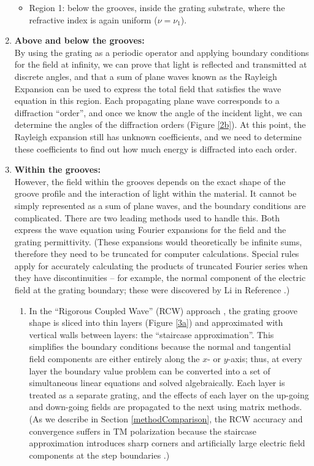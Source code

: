 \begin{enumerate}
\begin{itemize}
	\item Region 1: below the grooves, inside the grating substrate, where the refractive index is again uniform ($\nu=\nu_1$).
	\end{itemize}
\item \textbf{Above and below the grooves:}\\
By using the grating as a periodic operator and applying boundary conditions for the field at infinity, we can prove that light is reflected and transmitted at discrete angles, and that a sum of plane waves known as the Rayleigh Expansion can be used to express the total field that satisfies the wave equation in this region.  Each propagating plane wave corresponds to a diffraction ``order'', and once we know the angle of the incident light, we can determine the angles of the diffraction orders (Figure \ref{2b}).  At this point, the Rayleigh expansion still has unknown coefficients, and we need to determine these coefficients to find out how much energy is diffracted into each order.
\item \textbf{Within the grooves:}\\
However, the field within the grooves depends on the exact shape of the groove profile and the interaction of light within the material.  It cannot be simply represented as a sum of plane waves, and the boundary conditions are complicated.  There are two leading methods used to handle this.  Both express the wave equation using Fourier expansions for the field and the grating permittivity.  (These expansions would theoretically be infinite sums, therefore they need to be truncated for computer calculations.  Special rules apply for accurately calculating the products  of truncated Fourier series when they have discontinuities -- for example, the normal component of the electric field at the grating boundary; these were discovered by Li in Reference \cite{Li96b}.)
\begin{enumerate} 
	\item In the ``Rigorous Coupled Wave'' (RCW) approach \cite{Moh81,Moh95}, the grating groove shape is sliced into thin layers (Figure \ref{3a}) and approximated with vertical walls between layers: the ``staircase approximation''.  This simplifies the boundary conditions because the normal and tangential field components are either entirely along the $x$- or $y$-axis; thus, at every layer the boundary value problem can be converted into a set of simultaneous linear equations and solved algebraically.  Each layer is treated as a separate grating, and the effects of each layer on the up-going and down-going fields are propagated to the next using matrix methods.  (As we describe in Section \ref{methodComparison}, the RCW accuracy and convergence suffers in TM polarization because the staircase approximation introduces sharp corners and artificially large electric field components at the step boundaries \cite{Pop02}.)
	

\end{enumerate}
\end{enumerate}
